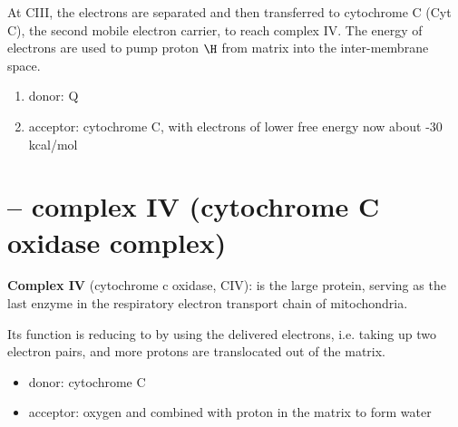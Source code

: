 At CIII, the electrons are separated and then transferred to cytochrome C (Cyt
C), the second mobile electron carrier, to reach complex IV.
The energy of electrons are used to pump proton $\H$ from matrix into the
inter-membrane space.
\begin{enumerate}
  \item donor: Q

  \item acceptor: cytochrome C, with electrons of lower free energy now about
  -30 kcal/mol
\end{enumerate}

\section{-- complex IV (cytochrome C oxidase complex)}
\label{sec:complex-IV-mito}

{\bf Complex IV} (cytochrome c oxidase, CIV): is the large protein,
serving as the last enzyme in the respiratory electron transport chain of
mitochondria.

Its function is reducing  to  by using the delivered electrons,
i.e. taking up two electron pairs, and more protons are translocated out of the
matrix.

\begin{itemize}
  \item donor: cytochrome C

  \item acceptor: oxygen  and combined with proton in the matrix to form
  water
\end{itemize}


